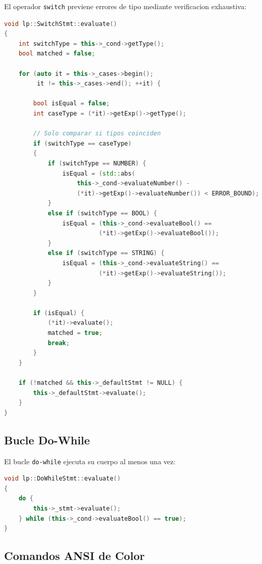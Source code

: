 \documentclass[11pt,a4paper]{article}
\begin{document}
El operador \texttt{switch} previene errores de tipo mediante verificacion exhaustiva:

\begin{lstlisting}[language=C++, caption={SwitchStmt - Blindaje de tipos}]
void lp::SwitchStmt::evaluate() 
{
    int switchType = this->_cond->getType();
    bool matched = false;

    for (auto it = this->_cases->begin(); 
         it != this->_cases->end(); ++it) {
        
        bool isEqual = false;
        int caseType = (*it)->getExp()->getType();
        
        // Solo comparar si tipos coinciden
        if (switchType == caseType) 
        {
            if (switchType == NUMBER) {
                isEqual = (std::abs(
                    this->_cond->evaluateNumber() - 
                    (*it)->getExp()->evaluateNumber()) < ERROR_BOUND);
            } 
            else if (switchType == BOOL) {
                isEqual = (this->_cond->evaluateBool() == 
                          (*it)->getExp()->evaluateBool());
            } 
            else if (switchType == STRING) {
                isEqual = (this->_cond->evaluateString() == 
                          (*it)->getExp()->evaluateString());
            }
        }

        if (isEqual) {
            (*it)->evaluate();
            matched = true;
            break; 
        }
    }
    
    if (!matched && this->_defaultStmt != NULL) {
        this->_defaultStmt->evaluate();
    }
}
\end{lstlisting}

\subsection{Bucle Do-While}

El bucle \texttt{do-while} ejecuta su cuerpo al menos una vez:

\begin{lstlisting}[language=C++, caption={DoWhileStmt - Ejecucion postcondicion}]
void lp::DoWhileStmt::evaluate() 
{
    do {
        this->_stmt->evaluate();
    } while (this->_cond->evaluateBool() == true); 
}
\end{lstlisting}

\subsection{Comandos ANSI de Color}
\end{document}
